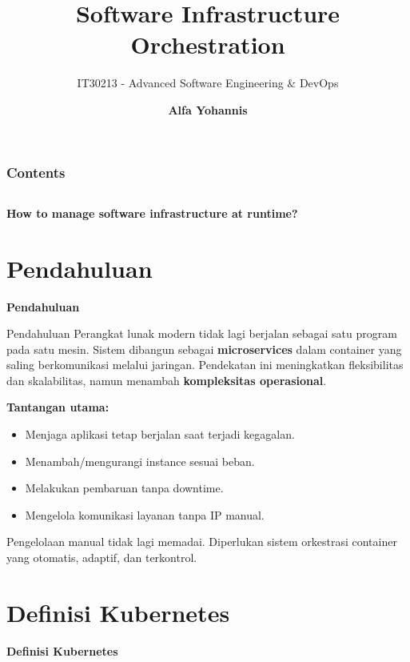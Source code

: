 \documentclass[aspectratio=169, table]{beamer}
\subtitle{IT30213 - Advanced Software Engineering \& DevOps}
\title{\Huge Software Infrastructure\\\vspace{8pt}	
	Orchestration\vspace{5pt}}
\author{\textbf{Alfa Yohannis}}
\begin{document}
	
	\frame{\titlepage}
	

	\begin{frame}[fragile]
		\frametitle{Contents}
		\vspace{20pt}
		\begin{columns}[t]
			\tableofcontents[sections={1-5}]
			
			\tableofcontents[sections={6-20}]
		\end{columns}
	\end{frame}
	
	\begin{frame}{\hfill}
		\centering
		\Huge{\textbf{How to manage software infrastructure at runtime?}}
	\end{frame}
	
\section{Pendahuluan}
\begin{frame}{\hfill}
	\centering
	\Huge{\textbf{Pendahuluan}}
\end{frame}

\begin{frame}{Pendahuluan}
\vspace{20pt}
Perangkat lunak modern tidak lagi berjalan sebagai satu program pada satu mesin.
Sistem dibangun sebagai \textbf{microservices} dalam container yang saling berkomunikasi melalui jaringan. Pendekatan ini meningkatkan fleksibilitas dan skalabilitas, namun menambah \textbf{kompleksitas operasional}.

\vspace{6pt}
\textbf{Tantangan utama:}
\begin{itemize}
    \item Menjaga aplikasi tetap berjalan saat terjadi kegagalan.
    \item Menambah/mengurangi instance sesuai beban.
    \item Melakukan pembaruan tanpa downtime.
    \item Mengelola komunikasi layanan tanpa IP manual.
\end{itemize}

\vspace{10pt}
Pengelolaan manual tidak lagi memadai.
Diperlukan sistem orkestrasi container yang otomatis, adaptif, dan terkontrol.
\end{frame}

\section{Definisi Kubernetes}
\begin{frame}{\hfill}
	\centering
	\Huge{\textbf{Definisi Kubernetes}}
\end{frame}
\end{document}
